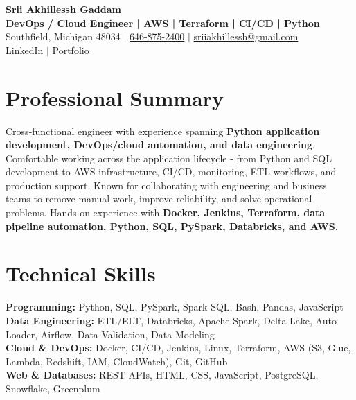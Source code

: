 \documentclass[letterpaper,10pt]{article}
\begin{document}
\fontsize{9.35pt}{10.45pt}\selectfont

\begin{center}
    {\LARGE \textbf{Srii Akhillessh Gaddam}} \\[-1pt]
    \textbf{DevOps / Cloud Engineer | AWS | Terraform | CI/CD | Python} \\[2pt]
    Southfield, Michigan 48034 $|$
    \href{tel:6468752400}{646-875-2400} $|$
    \href{mailto:sriiakhillessh@gmail.com}{sriiakhillessh@gmail.com} \\[1pt]
    \href{https://www.linkedin.com/in/srii-akhiilessh-gaddam-b48668191/}{LinkedIn} $|$
    \href{https://sriiakhillesshg.github.io/portfolio/}{Portfolio}
\end{center}
\vspace{-8pt}

\section{Professional Summary}
\small{Cross-functional engineer with experience spanning \textbf{Python application development, DevOps/cloud automation, and data engineering}. Comfortable working across the application lifecycle - from Python and SQL development to AWS infrastructure, CI/CD, monitoring, ETL workflows, and production support. Known for collaborating with engineering and business teams to remove manual work, improve reliability, and solve operational problems. Hands-on experience with \textbf{Docker, Jenkins, Terraform, data pipeline automation, Python, SQL, PySpark, Databricks, and AWS}.}

\section{Technical Skills}
\small{
\textbf{Programming:} Python, SQL, PySpark, Spark SQL, Bash, Pandas, JavaScript \\
\textbf{Data Engineering:} ETL/ELT, Databricks, Apache Spark, Delta Lake, Auto Loader, Airflow, Data Validation, Data Modeling \\
\textbf{Cloud \& DevOps:} Docker, CI/CD, Jenkins, Linux, Terraform, AWS (S3, Glue, Lambda, Redshift, IAM, CloudWatch), Git, GitHub \\
\textbf{Web \& Databases:} REST APIs, HTML, CSS, JavaScript, PostgreSQL, Snowflake, Greenplum
}
\end{document}
